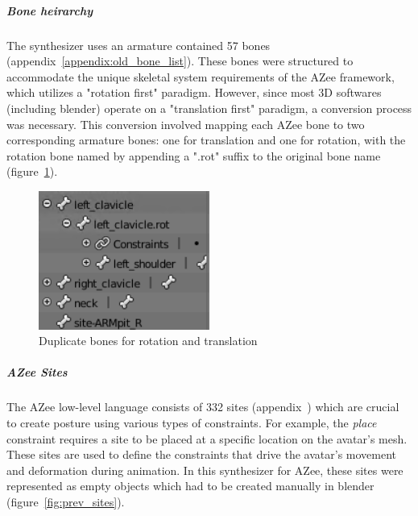 \documentclass[../../main.tex]{subfiles}
\begin{document}
\subparagraph{Bone heirarchy}
\label{ch:background_work:sign_language_synthesis:3d_techniques:sign_language_synthesis_systems:azee_based:low_level_synthesizer_for_azee:bone_heirarchy}

The synthesizer uses an armature contained 57 bones (appendix~\ref{appendix:old_bone_list}). These bones were structured to accommodate the unique skeletal system requirements of the AZee framework, which utilizes a "rotation first" paradigm. However, since most 3D softwares (including blender) operate on a "translation first" paradigm, a conversion process was necessary. This conversion involved mapping each AZee bone to two corresponding armature bones: one for translation and one for rotation, with the rotation bone named by appending a ".rot" suffix to the original bone name (figure~\ref{fig:old_bone_structure}).

\begin{figure}
    \centering
    \includegraphics[width=0.5\textwidth]{chapters/avatar_creation_pose_synthesis/images/old_bone_structure.png}
    \caption{Duplicate bones for rotation and translation}
    \label{fig:old_bone_structure}
\end{figure}

\subparagraph{AZee Sites}
\label{ch:background_work:sign_language_synthesis:3d_techniques:sign_language_synthesis_systems:azee_based:low_level_synthesizer_for_azee:azee_sites}

The AZee low-level language consists of 332 sites (appendix~\appendix{\ref{azee_sites}}) which are crucial to create posture using various types of constraints. For example, the \emph{place} constraint requires a site to be placed at a specific location on the avatar's mesh. These sites are used to define the constraints that drive the avatar's movement and deformation during animation. In this synthesizer for AZee, these sites were represented as empty objects which had to be created manually in blender (figure~\ref{fig:prev_sites}).
\end{document}
